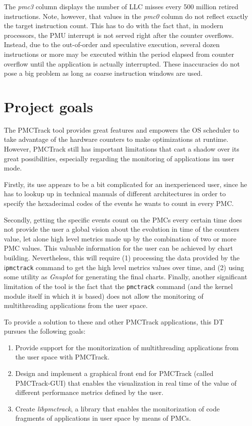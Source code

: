 The \textit{pmc3} column displays the number of LLC misses every 500
million retired instructions. Note, however, that values in the
\textit{pmc0} column do not reflect exactly the target instruction
count. This has to do with the fact that, in modern processors, the PMU
interrupt is not served right after the counter overflows. Instead, due
to the out-of-order and speculative execution, several dozen
instructions or more may be executed within the period elapsed from
counter overflow until the application is actually interrupted. These
inaccuracies do not pose a big problem as long as coarse instruction
windows are used.

\section{Project goals}\label{project-goals}

The PMCTrack tool provides great features and empowers the OS scheduler
to take advantage of the hardware counters to make optimizations at
runtime. However, PMCTrack still has important limitations that cast a
shadow over its great possibilities, especially regarding the monitoring
of applications im user mode.

Firstly, its use appears to be a bit complicated for an inexperienced
user, since he has to lookup up in technical manuals of different
architectures in order to specify the hexadecimal codes of the events he
wants to count in every PMC.

Secondly, getting the specific events count on the PMCs every certain
time does not provide the user a global vision about the evolution in
time of the counters value, let alone high level metrics made up by the
combination of two or more PMC values. This valuable information for the
user can be achieved by chart building. Nevertheless, this will require
(1) processing the data provided by the i\texttt{pmctrack} command to
get the high level metrics values over time, and (2) using some utility
as \emph{Gnuplot} for generating the final charts. Finally, another
significant limitation of the tool is the fact that the
\texttt{pmctrack} command (and the kernel module itself in which it is
based) does not allow the monitoring of multithreading applications from
the user space.

To provide a solution to these and other PMCTrack applications, this DT
pursues the following goals:

\begin{enumerate}
\def\labelenumi{\arabic{enumi}.}
\item
  Provide support for the monitorization of multithreading applications
  from the user space with PMCTrack.
\item
  Design and implement a graphical front end for PMCTrack (called
  PMCTrack-GUI) that enables the visualization in real time of the value
  of different performance metrics defined by the user.
\item
  Create \emph{libpmctrack}, a library that enables the monitorization
  of code fragments of applications in user space by means of PMCs.
\end{enumerate}

